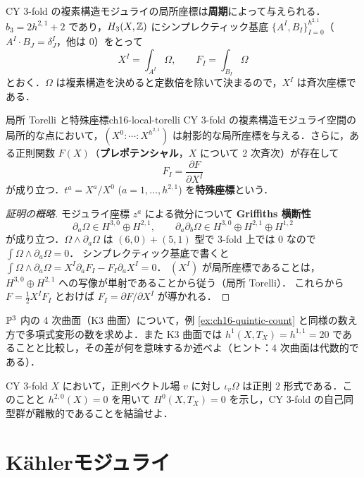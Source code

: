 CY 3-fold の複素構造モジュライの局所座標は\textbf{周期}によって与えられる．$b_3=2h^{2,1}+2$ であり，$H_3(X,\mathbb{Z})$ にシンプレクティック基底 $\{A^I,B_I\}_{I=0}^{h^{2,1}}$（$A^I\cdot B_J=\delta^I_J$，他は $0$）をとって
\begin{equation}
X^I=\int_{A^I}\Omega,\qquad F_I=\int_{B_I}\Omega
\label{eq:ch16-periods}
\end{equation}
とおく．$\Omega$ は複素構造を決めると定数倍を除いて決まるので，$X^I$ は斉次座標である．

\begin{mythm}{局所 Torelli と特殊座標}{ch16-local-torelli}
CY 3-fold の複素構造モジュライ空間の局所的な点において，$(X^0:\cdots:X^{h^{2,1}})$ は射影的な局所座標を与える．さらに，ある正則関数 $F(X)$（\textbf{プレポテンシャル}，$X$ について 2 次斉次）が存在して
\[
F_I=\frac{\partial F}{\partial X^I}
\]
が成り立つ．$t^a=X^a/X^0$ ($a=1,\dots,h^{2,1}$) を\textbf{特殊座標}という．
\end{mythm}

\begin{proof}[証明の概略]
モジュライ座標 $z^a$ による微分について \textbf{Griffiths 横断性}
\[
\partial_a\Omega\in H^{3,0}\oplus H^{2,1},\qquad \partial_a\partial_b\Omega\in H^{3,0}\oplus H^{2,1}\oplus H^{1,2}
\]
が成り立つ．$\Omega\wedge\partial_a\Omega$ は $(6,0)+(5,1)$ 型で $3$-fold 上では $0$ なので $\int\Omega\wedge\partial_a\Omega=0$．
シンプレクティック基底で書くと $\int\Omega\wedge\partial_a\Omega=X^I\partial_aF_I-F_I\partial_aX^I=0$．
$(X^I)$ が局所座標であることは，$H^{3,0}\oplus H^{2,1}$ への写像が単射であることから従う（局所 Torelli）．
これらから $F=\tfrac12X^IF_I$ とおけば $F_I=\partial F/\partial X^I$ が導かれる．
\end{proof}

$\mathbb{P}^3$ 内の 4 次曲面（K3 曲面）について，例 \ref{ex:ch16-quintic-count} と同様の数え方で多項式変形の数を求めよ．また K3 曲面では $h^1(X,T_X)=h^{1,1}=20$ であることと比較し，その差が何を意味するか述べよ（ヒント：4 次曲面は代数的である）．

CY 3-fold $X$ において，正則ベクトル場 $v$ に対し $\iota_v\Omega$ は正則 $2$ 形式である．このことと $h^{2,0}(X)=0$ を用いて $H^0(X,T_X)=0$ を示し，CY 3-fold の自己同型群が離散的であることを結論せよ．

\section{K\"ahlerモジュライ}

